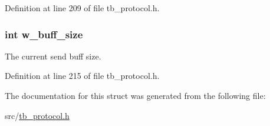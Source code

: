 Definition at line 209 of file tb\-\_\-protocol.\-h.

\hypertarget{structtb__prot__stats__t_a90beb7bd16530af85b6858932d219ed5}{
\subsubsection[{w\-\_\-buff\-\_\-size}]{\setlength{\rightskip}{0pt plus 5cm}int w\-\_\-buff\-\_\-size}}\label{structtb__prot__stats__t_a90beb7bd16530af85b6858932d219ed5}


The current send buff size. 



Definition at line 215 of file tb\-\_\-protocol.\-h.



The documentation for this struct was generated from the following file\-:\begin{DoxyCompactItemize}
\item 
src/\hyperlink{tb__protocol_8h}{tb\-\_\-protocol.\-h}\end{DoxyCompactItemize}
